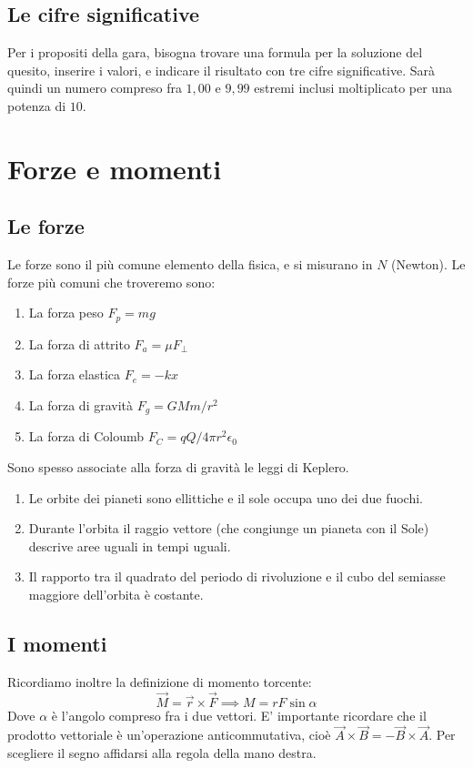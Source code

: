 \documentclass{article}
\begin{document}
\subsection{Le cifre significative}
Per i propositi della gara, bisogna trovare una formula per la soluzione del quesito, inserire i valori, e indicare il risultato con tre cifre significative.
Sarà quindi un numero compreso fra $1,00$ e $9,99$ estremi inclusi moltiplicato per una potenza di $10$.

\section{Forze e momenti}

\subsection{Le forze}
Le forze sono il più comune elemento della fisica, e si misurano in $N$ (Newton). Le forze più comuni che troveremo sono:
\begin{enumerate}
    \item La forza peso
    $F_p=mg$
    \item La forza di attrito
    $F_a=\mu F_{\perp}$
    \item La forza elastica
    $F_e=-kx$
    \item La forza di gravità
    $F_g=GMm/r^2$
    \item La forza di Coloumb
    $F_C=qQ/4\pi r^2 \epsilon_0$
\end{enumerate}
Sono spesso associate alla forza di gravità le leggi di Keplero.
\begin{enumerate}
    \item Le orbite dei pianeti sono ellittiche e il sole occupa uno dei due fuochi.
    \item Durante l’orbita il raggio vettore (che congiunge un pianeta con il Sole) descrive aree uguali in tempi uguali.
    \item Il rapporto tra il quadrato del periodo di rivoluzione e il cubo del semiasse maggiore dell’orbita è costante.
\end{enumerate}

\subsection{I momenti}
Ricordiamo inoltre la definizione di momento torcente:
\begin{equation}
    \Vec{M}=\Vec{r}\times\Vec{F}\implies M=rF\sin{\alpha}
\end{equation}
Dove $\alpha$ è l'angolo compreso fra i due vettori. E' importante ricordare che il prodotto vettoriale è un'operazione anticommutativa, cioè $\Vec{A}\times\Vec{B}=-\Vec{B}\times\Vec{A}$. Per scegliere il segno affidarsi alla regola della mano destra.
\end{document}
